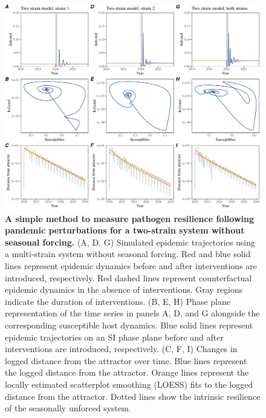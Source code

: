 \documentclass[12pt]{article}
\begin{document}
\pagebreak

\begin{figure}[!th]
\includegraphics[width=\textwidth]{../figure2/figure2_multi_noseas.pdf}
\caption{
\textbf{A simple method to measure pathogen resilience following pandemic perturbations for a two-strain system without seasonal forcing.}
(A, D, G) Simulated epidemic trajectories using a multi-strain system without seasonal forcing.
Red and blue solid lines represent epidemic dynamics before and after interventions are introduced, respectively.
Red dashed lines represent counterfactual epidemic dynamics in the absence of interventions.
Gray regions indicate the duration of interventions.
(B, E, H) Phase plane representation of the time series in panels A, D, and G alongside the corresponding susceptible host dynamics.
Blue solid lines represent epidemic trajectories on an SI phase plane before and after interventions are introduced, respectively.
(C, F, I) Changes in logged distance from the attractor over time.
Blue lines represent the logged distance from the attractor.
Orange lines represent the locally estimated scatterplot smoothing (LOESS) fits to the logged distance from the attractor.
Dotted lines show the intrinsic resilience of the seasonally unforced system.
}
\end{figure}

\pagebreak
\end{document}
